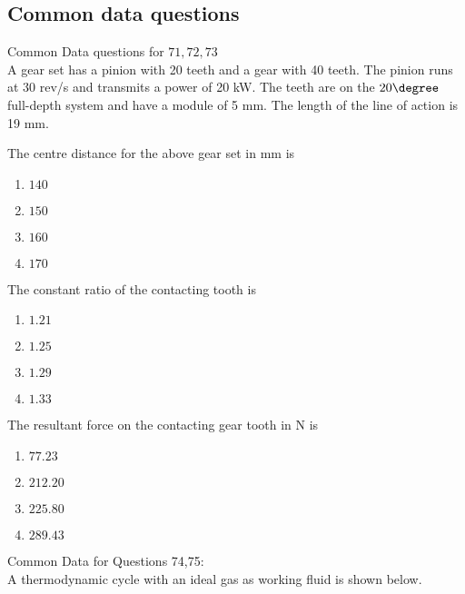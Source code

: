 		\subsection*{Common data questions}
		Common Data questions for $71,72,73$ \\
		A gear set has a pinion with 20 teeth and a gear with 40 teeth. The pinion runs at 30 rev/s and transmits a power of 20 kW. The teeth are on the $20\degree$ full-depth system and have a module of 5 mm. The length of the line of action is 19 mm.
	\item The centre distance for the above gear set in mm is
		\begin{enumerate}
			\item $140$
			\item $150$
			\item $160$
			\item $170$
		\end{enumerate}
	\item The constant ratio of the contacting tooth is 
		\begin{enumerate}
			\item $1.21$
			\item $1.25$
			\item $1.29$
			\item $1.33$
		\end{enumerate}
	\item The resultant force on the contacting gear tooth in N is 
		\begin{enumerate}
			\item $77.23$
			\item $212.20$
			\item $225.80$
			\item $289.43$
		\end{enumerate}
		Common Data for Questions 74,75: \\
		A thermodynamic cycle with an ideal gas as working fluid is shown below. \\
